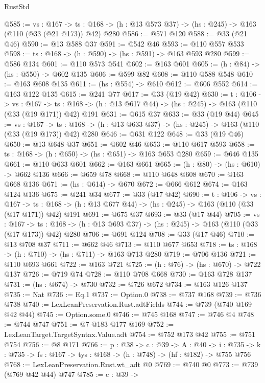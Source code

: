 \begin{lexlean}{RustStd}
\begin{coremodule}
@585 := {vs : @167} ->
  {ts : @168} -> (h : @13 @573 @37) -> (hs : @245) -> @163 (@110 (@33 (@21 @173)) @42) @280
@586 := @571 @120
@588 := @33 (@21 @46)
@590 := @13 @588 @37
@591 := @542 @46
@593 := @110 @557 @533
@598 := {ts : @168} -> (h : @590) -> (hs : @591) -> @163 @593 @280
@599 := @586 @134
@601 := @110 @573 @541
@602 := @163 @601
@605 := (h : @84) -> (hs : @550) -> @602 @135
@606 := @599 @82
@608 := @110 @588 @548
@610 := @163 @608 @135
@611 := (hs : @554) -> @610
@612 := @606 @552
@614 := @163 @122 @135
@615 := @241 @77
@617 := @33 (@19 @42)
@630 := {t : @106} ->
  {vs : @167} ->
  {ts : @168} -> (h : @13 @617 @44) -> (hs : @245) -> @163 (@110 (@33 (@19 @171)) @42) @191
@631 := @615 @37
@633 := @33 (@19 @44)
@645 := {vs : @167} ->
  {ts : @168} -> (h : @13 @633 @37) -> (hs : @245) -> @163 (@110 (@33 (@19 @173)) @42) @280
@646 := @631 @122
@648 := @33 (@19 @46)
@650 := @13 @648 @37
@651 := @602 @46
@653 := @110 @617 @593
@658 := {ts : @168} -> (h : @650) -> (hs : @651) -> @163 @653 @280
@659 := @646 @135
@661 := @110 @633 @601
@662 := @163 @661
@665 := (h : @80) -> (hs : @610) -> @662 @136
@666 := @659 @78
@668 := @110 @648 @608
@670 := @163 @668 @136
@671 := (hs : @614) -> @670
@672 := @666 @612
@674 := @163 @124 @136
@675 := @241 @34
@677 := @33 (@17 @42)
@690 := {t : @106} ->
  {vs : @167} ->
  {ts : @168} -> (h : @13 @677 @44) -> (hs : @245) -> @163 (@110 (@33 (@17 @171)) @42) @191
@691 := @675 @37
@693 := @33 (@17 @44)
@705 := {vs : @167} ->
  {ts : @168} -> (h : @13 @693 @37) -> (hs : @245) -> @163 (@110 (@33 (@17 @173)) @42) @280
@706 := @691 @124
@708 := @33 (@17 @46)
@710 := @13 @708 @37
@711 := @662 @46
@713 := @110 @677 @653
@718 := {ts : @168} -> (h : @710) -> (hs : @711) -> @163 @713 @280
@719 := @706 @136
@721 := @110 @693 @661
@722 := @163 @721
@725 := (h : @76) -> (hs : @670) -> @722 @137
@726 := @719 @74
@728 := @110 @708 @668
@730 := @163 @728 @137
@731 := (hs : @674) -> @730
@732 := @726 @672
@734 := @163 @126 @137
@735 := Nat
@736 := Eq.{1}
@737 := Option.{0}
@738 := @737 @168
@739 := @736 @738
@740 := LexLeanPreservation.Rust.adtFields
@744 := @739 (@740 @169 @42 @44)
@745 := Option.some.{0}
@746 := @745 @168
@747 := @746 @4
@748 := @744 @747
@751 := @7 @183 @177 @169
@752 := LexLeanTarget.TargetSyntax.Value.adt
@754 := @752 @173 @42
@755 := @751 @754
@756 := @8 @171
@766 := {p : @38} ->
  {c : @39} ->
  {A : @40} ->
  {i : @735} -> {k : @735} -> {fs : @167} -> {tys : @168} -> (h : @748) -> (hf : @182) -> @755 @756
@768 := LexLeanPreservation.Rust.wt_adt @0
@769 := @740 @0
@773 := @739 (@769 @42 @44) @747
@785 := {c : @39} ->

\end{coremodule}
\end{lexlean}
